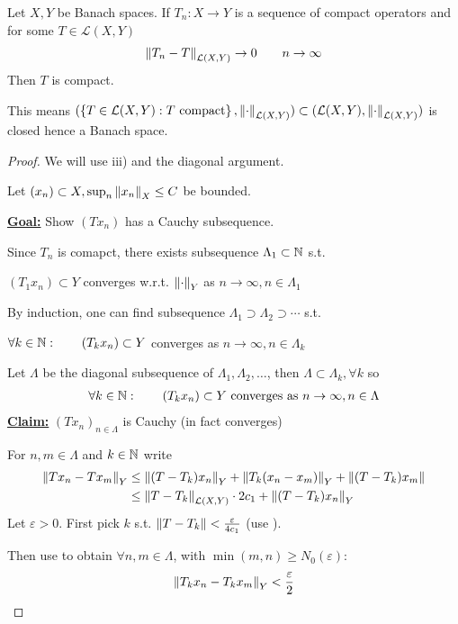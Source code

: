 \documentclass{article}
\begin{document}
\begin{theorem}\nl
\label{limit of compact operators}
    Let $X, Y$ be Banach spaces. If $T_n: X\to Y$ is a sequence of compact operators and for some $T \in \mathcal{L}(X,Y)$  
    \begin{align}
    \label{converging seq of compact operators}
      \left\|{T_n-T}\right\|_{\mathcal{L}(X,Y)} \to 0 \qquad n\to \infty    
    \end{align}
    Then $T$ is compact.
\end{theorem}  
\begin{remark}
    This means $(\left\{T \in \mathcal{L}(X,Y): T \ \text{compact} \right\}, \left\|{\cdot}\right\|_{\mathcal{L}(X,Y)}) \subset (\mathcal{L}(X,Y), \left\|{\cdot}\right\|_{\mathcal{L}(X,Y)})$ is closed hence a Banach space.
\end{remark}
\begin{proof}
    We will use  iii) and the diagonal argument.  

    Let $(x_n)\subset X, \sup_n \left\|{x_n}\right\|_X \leq C$ be bounded.  
    
    \underline{\textbf{Goal:}} Show $(Tx_n)$ has a Cauchy subsequence.  

    Since $T_n$ is comapct, there exists subsequence $\Lambda_1 \subset \mathbb{N}$ s.t.  
    \begin{center}
        $(T_1 x_n) \subset Y$ converges w.r.t. $\left\|{\cdot}\right\|_Y$ as $n\to \infty, n\in \Lambda_1$   
    \end{center}
    By induction, one can find subsequence $\Lambda_1 \supset \Lambda_2 \supset \cdots$ s.t.  
    \begin{center}
        $\forall k \in \mathbb{N}: \qquad (T_k x_n) \subset Y$ converges as $n\to \infty, n\in \Lambda_k$
    \end{center}
    Let $\Lambda$ be the diagonal subsequence of $\Lambda_1, \Lambda_2, \ldots$, then $\Lambda \subset \Lambda_k, \forall k$ so  
    \begin{align}
    \label{convergence of diagonal of compact operators}
        \forall k \in \natu: \qquad (T_k x_n) \subset Y \ \text{converges\ as} \  n\to \infty, n\in \Lambda
    \end{align}
    \underline{\textbf{Claim:}} $(Tx_n)_{n\in \Lambda}$ is Cauchy (in fact converges)  
    
    For $n,m\in \Lambda$ and $k\in \mathbb{N}$ write
    \begin{align*}
        \left\|{Tx_n - Tx_m}\right\|_Y &\leq \left\|{(T-T_k)x_n}\right\|_Y + \left\|{T_k(x_n-x_m)}\right\|_Y + \left\|{(T-T_k)x_m}\right\|  \\
        &\leq \left\|{T-T_k}\right\|_{\mathcal{L}(X,Y)} \cdot 2c_1 + \left\|{(T-T_k)x_n}\right\|_Y
    \end{align*}
    Let $\varepsilon >0$. First pick $k$ s.t. $\left\|{T-T_k}\right\| < \frac{\varepsilon}{4c_1}$ (use ).  
    
    Then use  to obtain $\forall n,m \in \Lambda$, with $\min (m,n) \geq N_0(\varepsilon)$:  
    $$
    \left\|{T_kx_n-T_kx_m}\right\|_Y < \frac{\varepsilon}{2}
    $$
\end{proof}
\end{document}
